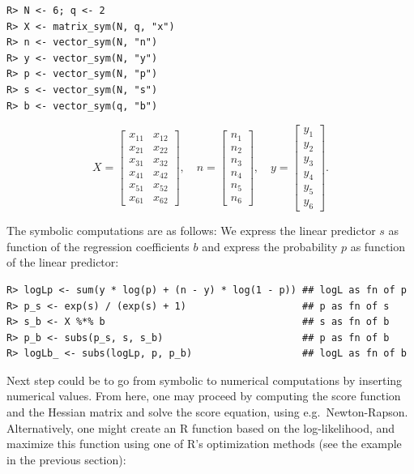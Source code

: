 \begin{verbatim}
R> N <- 6; q <- 2
R> X <- matrix_sym(N, q, "x")
R> n <- vector_sym(N, "n")
R> y <- vector_sym(N, "y")
R> p <- vector_sym(N, "p")
R> s <- vector_sym(N, "s")
R> b <- vector_sym(q, "b")
\end{verbatim}

\[
 X=\left[\begin{matrix}x_{11} & x_{12}\\x_{21} & x_{22}\\x_{31} & x_{32}\\x_{41} & x_{42}\\x_{51} & x_{52}\\x_{61} & x_{62}\end{matrix}\right], \quad
 n=\left[\begin{matrix}n_{1}\\n_{2}\\n_{3}\\n_{4}\\n_{5}\\n_{6}\end{matrix}\right], \quad
 y=\left[\begin{matrix}y_{1}\\y_{2}\\y_{3}\\y_{4}\\y_{5}\\y_{6}\end{matrix}\right] .
\]

The symbolic computations are as follows: We express the linear predictor \(s\) as function of the regression coefficients \(b\) and express the probability \(p\) as function of the linear predictor:

\begin{verbatim}
R> logLp <- sum(y * log(p) + (n - y) * log(1 - p)) ## logL as fn of p
R> p_s <- exp(s) / (exp(s) + 1)                    ## p as fn of s
R> s_b <- X %*% b                                  ## s as fn of b
R> p_b <- subs(p_s, s, s_b)                        ## p as fn of b
R> logLb_ <- subs(logLp, p, p_b)                   ## logL as fn of b
\end{verbatim}

Next step could be to go from symbolic to numerical computations by
inserting numerical values. From here, one may proceed by computing
the score function and the Hessian matrix and solve the score
equation, using e.g.~Newton-Rapson. Alternatively, one might create an
R function based on the log-likelihood, and maximize this function
using one of R's optimization methods (see the example in the
previous section):

